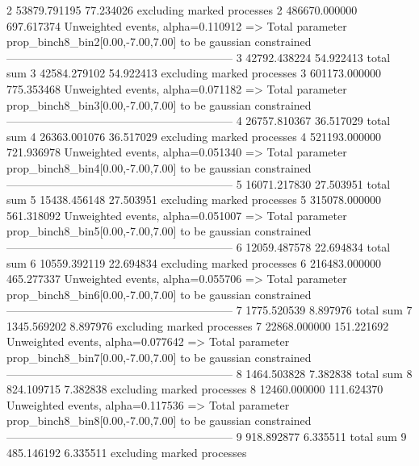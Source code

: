 2          53879.791195    77.234026       excluding marked processes    
2          486670.000000   697.617374      Unweighted events, alpha=0.110912
  => Total parameter prop_binch8_bin2[0.00,-7.00,7.00] to be gaussian constrained
------------------------------------------------------------
3          42792.438224    54.922413       total sum                     
3          42584.279102    54.922413       excluding marked processes    
3          601173.000000   775.353468      Unweighted events, alpha=0.071182
  => Total parameter prop_binch8_bin3[0.00,-7.00,7.00] to be gaussian constrained
------------------------------------------------------------
4          26757.810367    36.517029       total sum                     
4          26363.001076    36.517029       excluding marked processes    
4          521193.000000   721.936978      Unweighted events, alpha=0.051340
  => Total parameter prop_binch8_bin4[0.00,-7.00,7.00] to be gaussian constrained
------------------------------------------------------------
5          16071.217830    27.503951       total sum                     
5          15438.456148    27.503951       excluding marked processes    
5          315078.000000   561.318092      Unweighted events, alpha=0.051007
  => Total parameter prop_binch8_bin5[0.00,-7.00,7.00] to be gaussian constrained
------------------------------------------------------------
6          12059.487578    22.694834       total sum                     
6          10559.392119    22.694834       excluding marked processes    
6          216483.000000   465.277337      Unweighted events, alpha=0.055706
  => Total parameter prop_binch8_bin6[0.00,-7.00,7.00] to be gaussian constrained
------------------------------------------------------------
7          1775.520539     8.897976        total sum                     
7          1345.569202     8.897976        excluding marked processes    
7          22868.000000    151.221692      Unweighted events, alpha=0.077642
  => Total parameter prop_binch8_bin7[0.00,-7.00,7.00] to be gaussian constrained
------------------------------------------------------------
8          1464.503828     7.382838        total sum                     
8          824.109715      7.382838        excluding marked processes    
8          12460.000000    111.624370      Unweighted events, alpha=0.117536
  => Total parameter prop_binch8_bin8[0.00,-7.00,7.00] to be gaussian constrained
------------------------------------------------------------
9          918.892877      6.335511        total sum                     
9          485.146192      6.335511        excluding marked processes    
